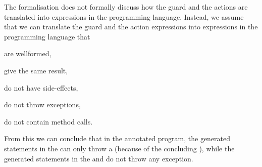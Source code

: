 
The formalisation does not formally discuss how the guard and the
actions are translated into expressions in the programming
language. Instead, we assume that we can translate the guard and the
action expressions into expressions in the programming
language that
\begin{inparaenum}
\item are wellformed,
\item give the same result,
\item do not have side-effects,
\item do not throw exceptions,
\item do not contain method calls.
\end{inparaenum}
From this we can conclude that in the annotated program, the generated
statements in the \preset can only throw a \JMLExc (because of the
concluding \Assert), while the generated statements in the \postset
and \excset do not throw any exception.

